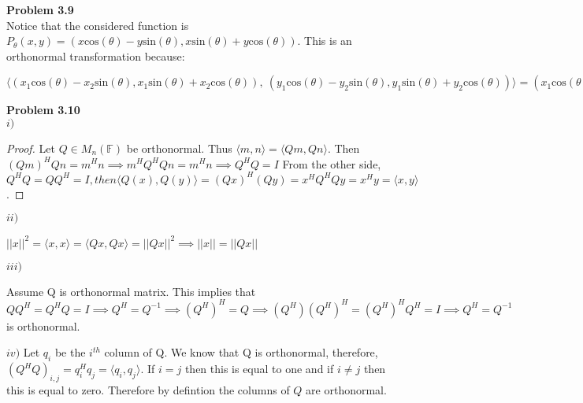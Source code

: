 \documentclass[letterpaper,12pt]{article}
\theoremstyle{definition}
\begin{document}
\vspace{5mm}

\noindent\textbf{Problem 3.9}\\
\noindent Notice that the considered function is $P_{\theta}(x, y) = (x\mathrm{cos}(\theta) - y\mathrm{sin}(\theta), x\mathrm{sin}(\theta) + y\mathrm{cos}(\theta))$.  This is an orthonormal transformation because:
\begin{center} $\langle (x_1\mathrm{cos}(\theta) - x_2\mathrm{sin}(\theta), x_1\mathrm{sin}(\theta) + x_2\mathrm{cos}(\theta)),\: (y_1\mathrm{cos}(\theta) - y_2\mathrm{sin}(\theta), y_1\mathrm{sin}(\theta) + y_2\mathrm{cos}(\theta)) \rangle 
= (x_1\mathrm{cos}(\theta) - x_2\mathrm{sin}(\theta)( y_1\mathrm{cos}(\theta) - y_2\mathrm{sin}(\theta))) + (x_1\mathrm{sin}(\theta) + x_2\mathrm{cos}(\theta)( y_1\mathrm{sin}(\theta) + y_2\mathrm{cos}(\theta))) = x_1y_1 + x_2y_2 = \langle x, y \rangle$
\end{center}

\vspace{5mm}

\noindent\textbf{Problem 3.10}\\
\noindent $i)$
\begin{proof} Let $Q \in M_n(\mathbb{F})$ be orthonormal.  Thus $\langle m, n\rangle = \langle Qm, Qn \rangle$.  Then $(Qm)^H Qn = m^H n \implies m^HQ^HQn = m^Hn \implies Q^HQ = I$  From the other side, 
$Q^HQ = QQ^H = I, then \langle Q(x), Q(y) \rangle = (Qx)^H(Qy) = x^HQ^HQy=x^Hy=\langle x, y \rangle$.
\end{proof}

\noindent $ii)$ \begin{center} $||x||^2 = \langle x, x \rangle= \langle Qx, Qx \rangle = ||Qx||^2 \implies ||x|| = ||Qx||$\end{center} 

\noindent $iii)$ \begin{center}  Assume Q is orthonormal matrix.  This implies that $QQ^H = Q^HQ = I \implies Q^H = Q^{-1} \implies (Q^H)^H =Q \implies (Q^H)(Q^H)^H = (Q^H)^HQ^H = I \implies Q^H = Q^{-1}$ is orthonormal. 
\end{center}

\noindent $iv)$ Let $q_i$ be the $i^{th}$ column of Q.  We know that Q is orthonormal, therefore, $(Q^HQ)_{i,j} = q_i^Hq_j = \langle q_i, q_j \rangle$.  If $i=j$ then this is equal to one and if $i\neq j$ then this is equal to zero.  Therefore by defintion the columns of $Q$ are orthonormal.\\
\end{document}
